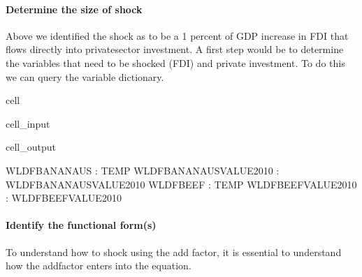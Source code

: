 \documentclass[letterpaper,10pt,english]{jupyterBook}
\begin{document}
\paragraph{Determine the size of shock}
\label{\detokenize{content/06_WBModels/ScenarioAnalysis:determine-the-size-of-shock}}
\sphinxAtStartPar
Above we identified the shock as to be a 1 percent of GDP increase in FDI that flows directly into private\sphinxhyphen{}sector investment.  A first step would be to determine the variables that need to be shocked (FDI) and private investment. To do this we can query the variable dictionary.

\begin{sphinxuseclass}{cell}\begin{sphinxVerbatimInput}

\begin{sphinxuseclass}{cell_input}
\begin{sphinxVerbatim}[commandchars=\\\{\}]
\PYG{p}{[}\PYG{p}{]}
\end{sphinxVerbatim}

\end{sphinxuseclass}\end{sphinxVerbatimInput}
\begin{sphinxVerbatimOutput}

\begin{sphinxuseclass}{cell_output}
\begin{sphinxVerbatim}[commandchars=\\\{\}]
WLDFBANANA\PYGZus{}US            : TEMP
WLDFBANANA\PYGZus{}US\PYGZus{}VALUE\PYGZus{}2010 : WLDFBANANA\PYGZus{}US\PYGZus{}VALUE\PYGZus{}2010
WLDFBEEF                 : TEMP
WLDFBEEF\PYGZus{}VALUE\PYGZus{}2010      : WLDFBEEF\PYGZus{}VALUE\PYGZus{}2010
\end{sphinxVerbatim}

\end{sphinxuseclass}\end{sphinxVerbatimOutput}

\end{sphinxuseclass}

\paragraph{Identify the functional form(s)}
\label{\detokenize{content/06_WBModels/ScenarioAnalysis:identify-the-functional-form-s}}
\sphinxAtStartPar
To understand how to shock using the add factor, it is essential to understand how the add\sphinxhyphen{}factor enters into the equation.
\end{document}
